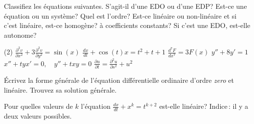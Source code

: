 \setcounter{exercise}{100}

\begin{exercise}
Classifiez les \'equations suivantes. S'agit-il d'une EDO ou d'une EDP?  Est-ce une \'equation ou un syst\`eme?  Quel est l'ordre?  Est-ce lin\'eaire ou non-lin\'eaire et si c'est lin\'eaire, est-ce homog\`ene? \`a coefficients constants?  Si c'est une EDO, est-elle autonome?
\begin{tasks}(2)
\task $\displaystyle \frac{\partial^2 v}{\partial x^2} + 3 \frac{\partial^2
v}{\partial y^2} = \sin(x)$
\task $\displaystyle \frac{d x}{dt} + \cos(t) x = t^2+t+1$
\task $\displaystyle \frac{d^7 F}{dx^7} = 3F(x)$
\task $\displaystyle y''+8y'=1$
\task $\displaystyle x''+tyx'=0, \quad y''+txy = 0$
\task $\displaystyle \frac{\partial u}{\partial t} = \frac{\partial^2 u}{\partial s^2} + u^2$
\end{tasks}
\end{exercise}

\begin{exercise}
\'Ecrivez la forme g\'en\'erale de l'\'equation diff\'erentielle ordinaire d'ordre \emph{zero} et lin\'eaire.  Trouvez sa solution g\'en\'erale.
\end{exercise}

\begin{exercise}
Pour quelles valeurs de $k$ l'\'equation $\frac{dx}{dt}+x^k = t^{k+2}$ est-elle lin\'eaire?  Indice\,: il y a deux valeurs possibles.
\end{exercise}

